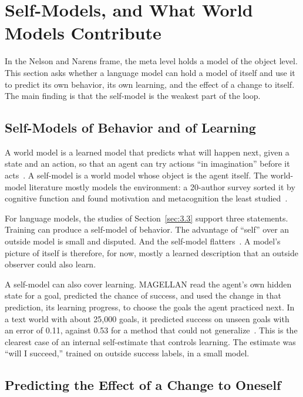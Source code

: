 \documentclass[journal]{IEEEtran}
\begin{document}
\section{Self-Models, and What World Models Contribute}\label{sec:4}

In the Nelson and Narens frame, the meta level holds a model of the object level. This section asks whether a language model can hold a model of itself and use it to predict its own behavior, its own learning, and the effect of a change to itself. The main finding is that the self-model is the weakest part of the loop.

\subsection{Self-Models of Behavior and of Learning}\label{sec:4.1}

A world model is a learned model that predicts what will happen next, given a state and an action, so that an agent can try actions ``in imagination'' before it acts~\cite{Ha2018}. A self-model is a world model whose object is the agent itself. The world-model literature mostly models the environment: a 20-author survey sorted it by cognitive function and found motivation and metacognition the least studied~\cite{Rupprecht2026}.

For language models, the studies of Section~\ref{sec:3.3} support three statements. Training can produce a self-model of behavior. The advantage of ``self'' over an outside model is small and disputed. And the self-model flatters~\cite{Blandfort2026,Barkan2025}. A model's picture of itself is therefore, for now, mostly a learned description that an outside observer could also learn.

A self-model can also cover learning. MAGELLAN read the agent's own hidden state for a goal, predicted the chance of success, and used the change in that prediction, its learning progress, to choose the goals the agent practiced next. In a text world with about 25,000 goals, it predicted success on unseen goals with an error of 0.11, against 0.53 for a method that could not generalize~\cite{Gaven2025}. This is the clearest case of an internal self-estimate that controls learning. The estimate was ``will I succeed,'' trained on outside success labels, in a small model.

\subsection{Predicting the Effect of a Change to Oneself}\label{sec:4.2}
\end{document}
